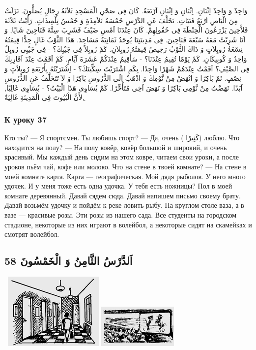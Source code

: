 \documentclass[a5paper]{article}
\begin{document}
وَاحِدٌ وَ وَاحِدٌ اِثْنَانِ. اِثْنَانِ وَ اِثْنَانِ اَرْبَعَةٌ. كَانَ فِى صَحْنِ الْمَسْجِدِ ثَلاَثَةُ رِجَالٍ يُصَلُّونَ. نَزَلَتْ مِنَ الْبَاصِ اَرْبَعُ فَتَيَاتٍ. تَخَلَّفَ عَنِ الدَّرْسِ خَمْسَةُ تَلاَمِذَةٍ وَ خَمْسُ تِلْمِيذَاتٍ. رَأَيْتُ ثَلاَثَةَ فَلاَّحِينَ يَزْرَعُونَ الْحِنْطَةَ فِى حُقُولِهِمْ. كَانَ عِنْدَنَا اَمْسِ ضَيْفٌ فَشَرِبَ سِتَّةَ فَنَاجِينَ شَايًا, وَ اَنَا شَرِبْتُ مَعَهُ سَبْعَةَ فَنَاجِينَ. فِى مَدِينَتِنَا يُوجَدُ ثَمَانِيَةُ مَسَاجِدَ. هَذَا الثَّوْبُ غَالٍ جِدًّا قِيمَتُهُ تِسْعَةُ رُوبِلاَتٍ وَ ذَاكَ الثَّوْبُ رَخِيصٌ قِيمَتُهُ رُوبِلاَنِ. كَمْ رُوبِلاً فِى جَيْبِكَ؟ - فِى جَيْبِى رُوبِلٌ وَاحِدٌ وَ كُوبِيكَانِ. كَمْ يَوْمًا تُقِيمُ عِنْدَنَا؟ - سَأُقِيمُ عِنْدَكُمْ عَشَرَةَ اَيَّامٍ. كَمْ اَقَمْتَ عِنْدَ اَقَارِبِكَ فِى الصَّيْفِ؟ اَقَمْتُ عِنْدَهُمْ شَهْرًا وَاحِدًا. بِكَمِ اشْتَرَيْتَ سِكِّينَكَ؟ - اِشْتَرَيْتُهُ بِأَرْبَعَةِ رُوبِلاَتٍ وَ نِصْفٍ. نَمْ بَاكِرًا وَ انْهَضْ مِنْ نَّوْمِكَ وَ اذْهَبْ اِلَى الدُّرُوسِ بَاكِرًا وَ لاَ تَتَخَلَّفْ عَنِ الدُّرُوسِ اَبَدًا. نَهَضْتُ مِنْ نَّوْمِى بَاكِرًا وَ نَهَضَ اَخِى مُتَأَخِّرًا. كَمْ يُسَاوِى هَذَا الْبَيْتُ؟ - يُسَاوِى غَالِيًا, ِلأَنَّ الْبُيُوتَ فِى الْمَدِينَةِ غَالِيَةٌ.

\subsubsection{К уроку 37}
Кто ты? — Я спортсмен. Ты любишь спорт? — Да, очень ( كَثِيرًا) люблю. Что находится на полу? — На полу ковёр, ковёр большой и широкий, и очень красивый. Мы каждый день сидим на этом ковре, читаем свои уроки, а после уроков пьём чай, кофе или молоко. Что на стене в твоей комнате? — На стене в моей комнате карта. Карта — географическая. Мой дядя рыболов. У него много удочек. И у меня тоже есть одна удочка. У тебя есть ножницы? Пол в моей комнате деревянный. Давай сядем сюда. Давай напишем письмо своему брату. Давай возьмём удочку и пойдём к реке ловить рыбу. На круглом столе ваза, а в вазе — красивые розы. Эти розы из нашего сада. Все студенты на городском стадионе, некоторые из них играют в волейбол, а некоторые сидят на скамейках и смотрят волейбол.

\subsection{اَلدَّرْسُ الثَّامِنُ وَ الْخَمْسُونَ 58}
\  \includegraphics[width=1.9272in,height=1.4689in]{MuhammadBagauddinlatinized-img190.png}   \includegraphics[width=1.5417in,height=0.8335in]{MuhammadBagauddinlatinized-img191.png} 
\end{document}
